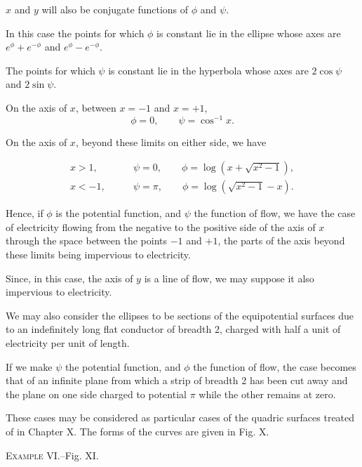 \documentclass[11pt,a4paper]{article}
\begin{document}
$x$ and $y$ will also be conjugate functions of $\phi$ and $\psi$.

In this case the points for which $\phi$ is constant lie in the ellipse whose axes are $e^\phi+e^{-\phi}$ and $e^\phi-e^{-\phi}$.

The points for which $\psi$ is constant lie in the hyperbola whose
axes are $2\cos\psi$ and $2\sin\psi$.

On the axis of $x$, between $x=-1$ and $x=+1$,
\begin{equation}\tag{4}
\phi=0,\qquad \psi=\cos^{-1}x.
\end{equation}

On the axis of $x$, beyond these limits on either side, we have

\begin{equation}\tag{5}
\begin{aligned}
x>1,\qquad &\psi=0,\qquad
  \phi=\log\left(x+\sqrt{x^2-1}\right),\\
x<-1,\qquad &\psi=\pi,\qquad
  \phi=\log\left(\sqrt{x^2-1}-x\right).
\end{aligned}
\end{equation}

Hence, if $\phi$ is the potential function, and $\psi$ the function of
flow, we have the case of electricity flowing from the negative to the
positive side of the axis of $x$ through the space between the points
$-1$ and $+1$, the parts of the axis beyond these limits being
impervious to electricity.

Since, in this case, the axis of $y$ is a line of flow, we may suppose
it also impervious to electricity.

We may also consider the ellipses to be sections of the equipotential surfaces due to an indefinitely long flat conductor of breadth 2, charged with half a unit of electricity per unit of length.

If we make $\psi$ the potential function, and $\phi$ the function of
flow, the case becomes that of an infinite plane from which a strip of
breadth 2 has been cut away and the plane on one side charged to
potential $\pi$ while the other remains at zero.

These cases may be considered as particular cases of the quadric surfaces treated of in Chapter X. The forms of the curves are given in Fig. X.

\begin{center}
\textsc{Example VI.}--Fig. XI.
\end{center}
\end{document}
